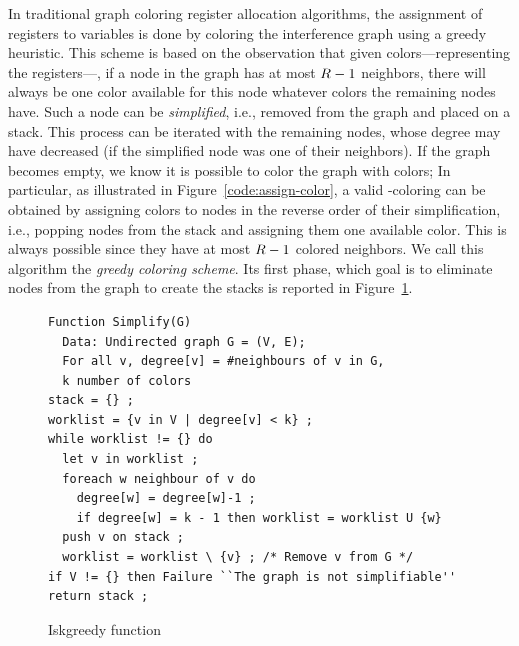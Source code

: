 {In traditional graph coloring register allocation algorithms, the assignment of registers to variables is done by coloring the interference graph using a greedy heuristic.
This scheme is based on the observation that given \regs colors---representing the registers---, if a node in the graph has at most $R-1$ neighbors, there will always be one color available for this node whatever colors the remaining nodes have.
Such a node can be \emph{simplified}, i.e., removed from the graph and placed on a stack.
This process can be iterated with the remaining nodes, whose degree may have decreased (if the simplified node was one of their neighbors).
If the graph becomes empty, we know it is possible to color the graph with \regs colors; 
In particular, as illustrated in Figure~\ref{code:assign-color}, a valid \regs-coloring can be obtained by assigning colors to nodes in the reverse order of their simplification, i.e., popping nodes from the stack and assigning them one available color.
This is always possible since they have at most $R-1$ colored neighbors.
We call this algorithm the \emph{greedy coloring scheme}.
Its first phase, which goal is to eliminate nodes from the graph to create the stacks is reported in Figure~\ref{code:is-k-greedy}.


\begin{figure}
\begin{verbatim}
Function Simplify(G)
  Data: Undirected graph G = (V, E);
  For all v, degree[v] = #neighbours of v in G,
  k number of colors
stack = {} ;
worklist = {v in V | degree[v] < k} ;
while worklist != {} do
  let v in worklist ;
  foreach w neighbour of v do
    degree[w] = degree[w]-1 ;
    if degree[w] = k - 1 then worklist = worklist U {w}
  push v on stack ;
  worklist = worklist \ {v} ; /* Remove v from G */
if V != {} then Failure ``The graph is not simplifiable''
return stack ;
\end{verbatim}
\caption{Iskgreedy function}
\label{code:is-k-greedy}
\end{figure}


}
